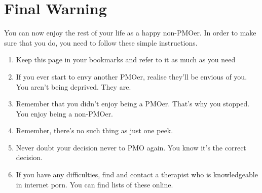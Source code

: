 \documentclass[easypeasy.tex]{subfiles}
\begin{document}
\section{Final Warning}

You can now enjoy the rest of your life as a happy non-PMOer. In order to make sure that you do, you need to follow these simple instructions.
\begin{enumerate}
  \item Keep this page in your bookmarks and refer to it as much as you need
  \item If you ever start to envy another PMOer, realise they'll be envious of you. You aren't being deprived. They are.
  \item Remember that you didn't enjoy being a PMOer. That's why you stopped. You enjoy being a non-PMOer.
  \item Remember, there's no such thing as just one peek.
  \item Never doubt your decision never to PMO again. You know it's the correct decision.
  \item If you have any difficulties, find and contact a therapist who is knowledgeable in internet porn. You can find lists of these online.
\end{enumerate}
\end{document}
